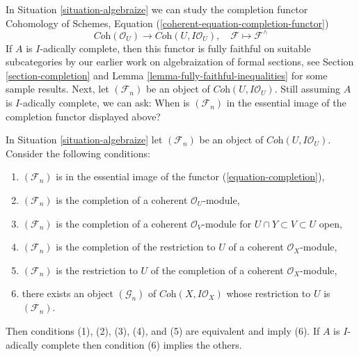\noindent
In Situation \ref{situation-algebraize} we can study the completion functor
Cohomology of Schemes, Equation (\ref{coherent-equation-completion-functor})
\begin{equation}
\label{equation-completion}
\textit{Coh}(\mathcal{O}_U)
\longrightarrow
\textit{Coh}(U, I\mathcal{O}_U),\quad
\mathcal{F} \longmapsto \mathcal{F}^\wedge
\end{equation}
If $A$ is $I$-adically complete, then this functor is fully faithful
on suitable subcategories by our earlier work on algebraization of
formal sections, see Section \ref{section-completion} and
Lemma \ref{lemma-fully-faithful-inequalities} for some sample results.
Next, let $(\mathcal{F}_n)$ be an object of $\textit{Coh}(U, I\mathcal{O}_U)$.
Still assuming $A$ is $I$-adically complete, we can ask:
When is $(\mathcal{F}_n)$ in the essential image of the completion
functor displayed above?

\begin{lemma}
\label{lemma-essential-image-completion}
In Situation \ref{situation-algebraize} let $(\mathcal{F}_n)$
be an object of $\textit{Coh}(U, I\mathcal{O}_U)$. Consider the
following conditions:
\begin{enumerate}
\item $(\mathcal{F}_n)$ is in the essential image
of the functor (\ref{equation-completion}),
\item $(\mathcal{F}_n)$ is the completion of a
coherent $\mathcal{O}_U$-module,
\item $(\mathcal{F}_n)$ is the completion of a coherent
$\mathcal{O}_V$-module for $U \cap Y \subset V \subset U$ open,
\item $(\mathcal{F}_n)$ is the completion of
the restriction to $U$ of a coherent $\mathcal{O}_X$-module,
\item $(\mathcal{F}_n)$ is the restriction to $U$ of
the completion of a coherent $\mathcal{O}_X$-module,
\item there exists an object $(\mathcal{G}_n)$ of
$\textit{Coh}(X, I\mathcal{O}_X)$ whose restriction
to $U$ is $(\mathcal{F}_n)$.
\end{enumerate}
Then conditions (1), (2), (3), (4), and (5) are equivalent and imply (6).
If $A$ is $I$-adically complete then condition (6) implies the others.
\end{lemma}

